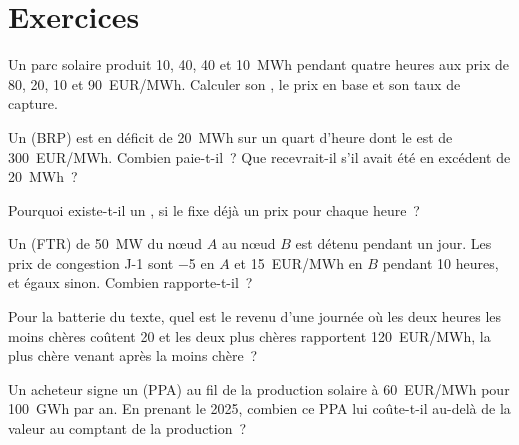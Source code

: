 \section{Exercices}

\begin{exercise}[$\star$]\label{exo:m3:power-markets-trading:1}
Un parc solaire produit 10, 40, 40 et 10~MWh pendant quatre heures aux prix de 80, 20, 10 et
\qty{90}{EUR/MWh}. Calculer son , le prix en base et son taux de capture.
\end{exercise}

\begin{exercise}[$\star$]\label{exo:m3:power-markets-trading:2}
Un  (BRP) est en déficit de 20~MWh sur un quart d'heure dont le  est de \qty{300}{EUR/MWh}. Combien
paie-t-il~? Que recevrait-il s'il avait été en excédent de 20~MWh~?
\end{exercise}

\begin{exercise}[$\star$]\label{exo:m3:power-markets-trading:3}
Pourquoi existe-t-il un , si le  fixe déjà un prix pour chaque
heure~?
\end{exercise}

\begin{exercise}[$\star\star$]\label{exo:m3:power-markets-trading:4}
Un  (FTR) de 50~MW du nœud $A$ au nœud $B$ est détenu pendant un jour. Les prix de congestion J-1 sont
\qty{-5}{} en $A$ et \qty{+15}{EUR/MWh} en $B$ pendant 10 heures, et égaux sinon. Combien
rapporte-t-il~?
\end{exercise}

\begin{exercise}[$\star\star$]\label{exo:m3:power-markets-trading:5}
Pour la batterie du texte, quel est le revenu d'une journée où les deux heures les moins chères coûtent
\qty{20}{} et les deux plus chères rapportent \qty{120}{EUR/MWh}, la plus chère venant après la moins chère~?
\end{exercise}

\begin{exercise}[$\star\star$]\label{exo:m3:power-markets-trading:6}
Un acheteur signe un  (PPA) au fil de la production solaire à \qty{60}{EUR/MWh} pour 100~GWh par an. En prenant le
 2025, combien ce PPA lui coûte-t-il au-delà de la valeur au comptant de la production~?
\end{exercise}

